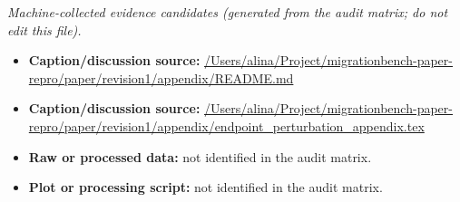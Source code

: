 \emph{Machine-collected evidence candidates (generated from the audit matrix; do not edit this file).}
\begin{itemize}[leftmargin=1.4em,noitemsep]
\item \textbf{Caption/discussion source:} \url{/Users/alina/Project/migrationbench-paper-repro/paper/revision1/appendix/README.md}
\item \textbf{Caption/discussion source:} \url{/Users/alina/Project/migrationbench-paper-repro/paper/revision1/appendix/endpoint_perturbation_appendix.tex}
\item \textbf{Raw or processed data:} not identified in the audit matrix.
\item \textbf{Plot or processing script:} not identified in the audit matrix.
\end{itemize}
